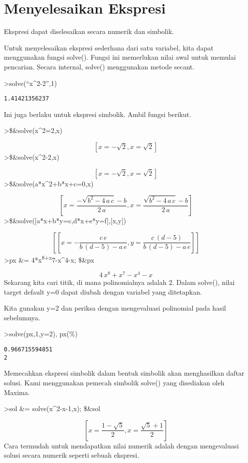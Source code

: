 \documentclass[
]{book}
\begin{document}
\chapter{Menyelesaikan Ekspresi}\label{menyelesaikan-ekspresi}

Ekspresi dapat diselesaikan secara numerik dan simbolik.

Untuk menyelesaikan ekspresi sederhana dari satu variabel, kita dapat menggunakan fungsi solve(). Fungsi ini memerlukan nilai awal untuk memulai pencarian. Secara internal, solve() menggunakan metode secant.

\textgreater solve(``x\^{}2-2'',1)

\begin{verbatim}
1.41421356237
\end{verbatim}

Ini juga berlaku untuk ekspresi simbolik. Ambil fungsi berikut.

\textgreater\$\&solve(x\^{}2=2,x)

\[\left[ x=-\sqrt{2} , x=\sqrt{2} \right]\]\textgreater\$\&solve(x\^{}2-2,x)

\[\left[ x=-\sqrt{2} , x=\sqrt{2} \right]\]\textgreater\$\&solve(a*x\^{}2+b*x+c=0,x)

\[\left[ x=\frac{-\sqrt{b^2-4\,a\,c}-b}{2\,a} , x=\frac{\sqrt{b^2-4\,a\,c}-b}{2\,a} \right]\]\textgreater\$\&solve({[}a*x+b*y=c,d*x+e*y=f{]},{[}x,y{]})

\[\left[ \left[ x=-\frac{c\,e}{b\,\left(d-5\right)-a\,e} , y=\frac{c\,\left(d-5\right)}{b\,\left(d-5\right)-a\,e} \right]  \right]\]\textgreater px \&= 4*x\textsuperscript{8+x}7-x\^{}4-x; \$\&px

\[4\,x^8+x^7-x^4-x\]Sekarang kita cari titik, di mana polinomialnya adalah 2. Dalam solve(), nilai target default y=0 dapat diubah dengan variabel yang ditetapkan.

Kita gunakan y=2 dan periksa dengan mengevaluasi polinomial pada hasil sebelumnya.

\textgreater solve(px,1,y=2), px(\%)

\begin{verbatim}
0.966715594851
2
\end{verbatim}

Memecahkan ekspresi simbolik dalam bentuk simbolik akan menghasilkan daftar solusi. Kami menggunakan pemecah simbolik solve() yang disediakan oleh Maxima.

\textgreater sol \&= solve(x\^{}2-x-1,x); \$\&sol

\[\left[ x=\frac{1-\sqrt{5}}{2} , x=\frac{\sqrt{5}+1}{2} \right]\]Cara termudah untuk mendapatkan nilai numerik adalah dengan mengevaluasi solusi secara numerik seperti sebuah ekspresi.
\end{document}

